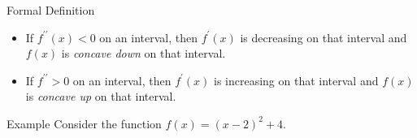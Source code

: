 \documentclass[Lecture.tex]{subfiles}
\begin{document}
\begin{frame}{Formal Definition}
  \begin{defn}
    \begin{itemize}
    \item<1->
      If $f^{\prime\prime}(x) < 0$ on an interval, then $f^\prime(x)$ is decreasing on that interval and $f(x)$ is {\it concave down} on that interval.
    \item<2->
      If $f^{\prime\prime} > 0$ on an interval, then $f^\prime(x)$ is increasing on that interval and $f(x)$ is {\it concave up} on that interval.
    \end{itemize}
  \end{defn}
\end{frame}

\begin{frame}{Example}
  Consider the function $f(x) = (x - 2)^2 + 4$.
\end{frame}
\end{document}
